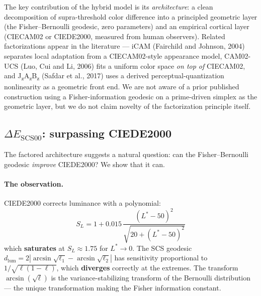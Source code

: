 \documentclass[12pt,a4paper]{article}
\begin{document}
The key contribution of the hybrid model is its \emph{architecture}: a
clean decomposition of supra-threshold color difference into a
principled geometric layer (the Fisher--Bernoulli geodesic, zero
parameters) and an empirical cortical layer (CIECAM02 or CIEDE2000,
measured from human observers). Related factorizations appear in the
literature --- iCAM (Fairchild and Johnson, 2004) separates local
adaptation from a CIECAM02-style appearance model, CAM02-UCS (Luo,
Cui and Li, 2006) fits a uniform color space \emph{on top of}
CIECAM02, and J\textsubscript{z}A\textsubscript{z}B\textsubscript{z}
(Safdar et al., 2017) uses a derived perceptual-quantization
nonlinearity as a geometric front end. We are not aware of a prior
published construction using a Fisher-information geodesic on a
prime-driven simplex as the geometric layer, but we do not claim
novelty of the factorization principle itself.

\subsection{$\Delta E_{\mathrm{SCS00}}$: surpassing CIEDE2000}
\label{sec:sct00}

The factored architecture suggests a natural question: can the
Fisher--Bernoulli geodesic \emph{improve} CIEDE2000? We show that
it can.

\paragraph{The observation.}
CIEDE2000 corrects luminance with a polynomial:
\[
  S_L = 1 + 0.015\,\frac{(L^*-50)^2}{\sqrt{20+(L^*-50)^2}}
\]
which \textbf{saturates} at $S_L \approx 1.75$ for $L^* \to 0$. The
SCS geodesic $d_{\mathrm{lum}} = 2|\arcsin\sqrt{\ell_1} -
\arcsin\sqrt{\ell_2}|$ has sensitivity proportional to
$1/\sqrt{\ell(1-\ell)}$, which \textbf{diverges} correctly at
the extremes. The transform $\arcsin(\sqrt{\ell})$ is the
variance-stabilizing transform of the Bernoulli distribution --- the
unique transformation making the Fisher information constant.
\end{document}
